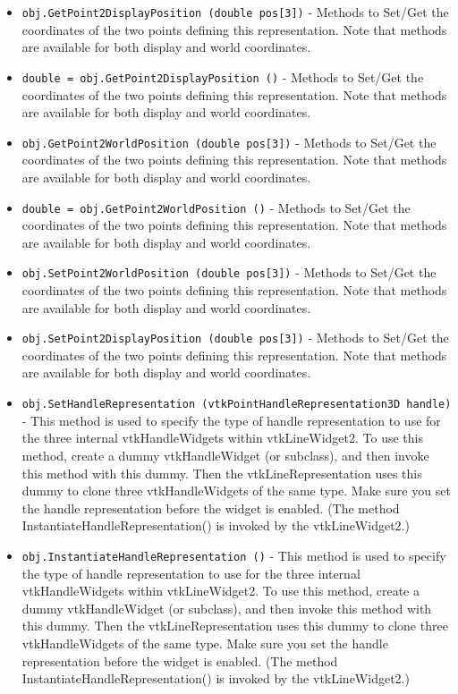 \begin{itemize}
\item  \verb|obj.GetPoint2DisplayPosition (double pos[3])| -  Methods to Set/Get the coordinates of the two points defining
 this representation. Note that methods are available for both
 display and world coordinates.

\item  \verb|double = obj.GetPoint2DisplayPosition ()| -  Methods to Set/Get the coordinates of the two points defining
 this representation. Note that methods are available for both
 display and world coordinates.

\item  \verb|obj.GetPoint2WorldPosition (double pos[3])| -  Methods to Set/Get the coordinates of the two points defining
 this representation. Note that methods are available for both
 display and world coordinates.

\item  \verb|double = obj.GetPoint2WorldPosition ()| -  Methods to Set/Get the coordinates of the two points defining
 this representation. Note that methods are available for both
 display and world coordinates.

\item  \verb|obj.SetPoint2WorldPosition (double pos[3])| -  Methods to Set/Get the coordinates of the two points defining
 this representation. Note that methods are available for both
 display and world coordinates.

\item  \verb|obj.SetPoint2DisplayPosition (double pos[3])| -  Methods to Set/Get the coordinates of the two points defining
 this representation. Note that methods are available for both
 display and world coordinates.

\item  \verb|obj.SetHandleRepresentation (vtkPointHandleRepresentation3D handle)| -  This method is used to specify the type of handle representation to
 use for the three internal vtkHandleWidgets within vtkLineWidget2.
 To use this method, create a dummy vtkHandleWidget (or subclass),
 and then invoke this method with this dummy. Then the 
 vtkLineRepresentation uses this dummy to clone three vtkHandleWidgets
 of the same type. Make sure you set the handle representation before
 the widget is enabled. (The method InstantiateHandleRepresentation()
 is invoked by the vtkLineWidget2.)

\item  \verb|obj.InstantiateHandleRepresentation ()| -  This method is used to specify the type of handle representation to
 use for the three internal vtkHandleWidgets within vtkLineWidget2.
 To use this method, create a dummy vtkHandleWidget (or subclass),
 and then invoke this method with this dummy. Then the 
 vtkLineRepresentation uses this dummy to clone three vtkHandleWidgets
 of the same type. Make sure you set the handle representation before
 the widget is enabled. (The method InstantiateHandleRepresentation()
 is invoked by the vtkLineWidget2.)


\end{itemize}
